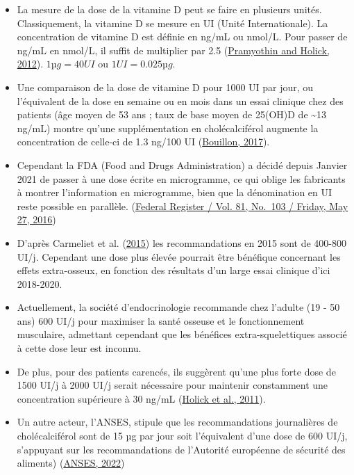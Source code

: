 \documentclass[
  letterpaper,
  DIV=11,
  numbers=noendperiod]{scrartcl}
\begin{document}
\begin{itemize}
\item
  La mesure de la dose de la vitamine D peut se faire en plusieurs
  unités. Classiquement, la vitamine D se mesure en UI (Unité
  Internationale). La concentration de vitamine D est définie en ng/mL
  ou nmol/L. Pour passer de ng/mL en nmol/L, il suffit de multiplier par
  2.5 (\protect\hyperlink{ref-Pramyothin.2012}{Pramyothin and Holick,
  2012}). \(1 µg = 40 UI\) ou \(1 UI = 0.025 µg\).
\item
  Une comparaison de la dose de vitamine D pour 1000 UI par jour, ou
  l'équivalent de la dose en semaine ou en mois dans un essai clinique
  chez des patients (âge moyen de 53 ans ; taux de base moyen de 25(OH)D
  de \textasciitilde13 ng/mL) montre qu'une supplémentation en
  cholécalciférol augmente la concentration de celle-ci de 1.3 ng/100 UI
  (\protect\hyperlink{ref-Bouillon.2017}{Bouillon, 2017}).
\item
  Cependant la FDA (Food and Drugs Administration) a décidé depuis
  Janvier 2021 de passer à une dose écrite en microgramme, ce qui oblige
  les fabricants à montrer l'information en microgramme, bien que la
  dénomination en UI reste possible en parallèle.
  (\href{https://www.govinfo.gov/content/pkg/FR-2016-05-27/pdf/2016-11867.pdf}{Federal
  Register / Vol. 81, No.~103 / Friday, May 27, 2016})
\item
  D'après Carmeliet et al.
  (\protect\hyperlink{ref-Carmeliet.2015}{2015}) les recommandations en
  2015 sont de 400-800 UI/j. Cependant une dose plus élevée pourrait
  être bénéfique concernant les effets extra-osseux, en fonction des
  résultats d'un large essai clinique d'ici 2018-2020.
\item
  Actuellement, la société d'endocrinologie recommande chez l'adulte (19
  - 50 ans) 600 UI/j pour maximiser la santé osseuse et le
  fonctionnement musculaire, admettant cependant que les bénéfices
  extra-squelettiques associé à cette dose leur est inconnu.
\item
  De plus, pour des patients carencés, ils suggèrent qu'une plus forte
  dose de 1500 UI/j à 2000 UI/j serait nécessaire pour maintenir
  constamment une concentration supérieure à 30 ng/mL
  (\protect\hyperlink{ref-Holick.2011}{Holick et al., 2011}).
\item
  Un autre acteur, l'ANSES, stipule que les recommandations journalières
  de cholécalciférol sont de 15 µg par jour soit l'équivalent d'une dose
  de 600 UI/j, s'appuyant sur les recommandations de l'Autorité
  européenne de sécurité des aliments)
  (\protect\hyperlink{ref-ANSES.2022}{ANSES, 2022})
\end{itemize}
\end{document}

